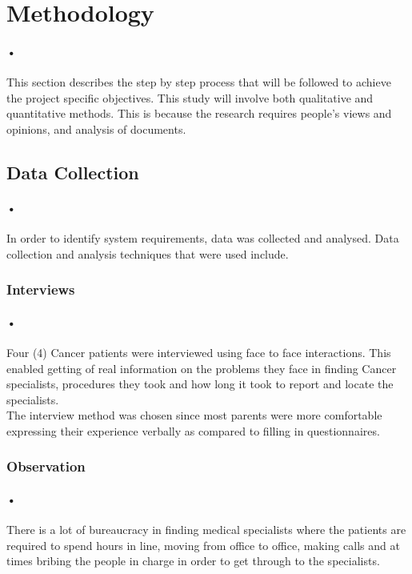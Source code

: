 \documentclass[12pt]{article}
\begin{document}
\section{Methodology}
\paragraph{•}This section describes the step by step process that will be followed to achieve the project specific objectives. This study will involve both qualitative and quantitative methods.
This is because the research requires people’s views and opinions, and analysis of documents.

\subsection{Data Collection}
\paragraph{•}In order to identify system requirements, data was collected and analysed. Data collection and analysis techniques that were used include.

\subsubsection{Interviews} 
\paragraph{•}Four (4) Cancer patients were interviewed using face to face interactions. This enabled getting of real information on the problems they face in finding Cancer specialists, procedures they took and how long it took to report and locate the specialists.
\\The interview method was chosen since most parents were more comfortable expressing their experience verbally as compared to filling in questionnaires. 

\subsubsection{Observation}

\paragraph{•}There is a lot of bureaucracy in finding medical specialists where the patients are required to spend hours in line, moving from office to office, making calls and at times bribing the people in charge in order to get through to the specialists. 
\end{document}

